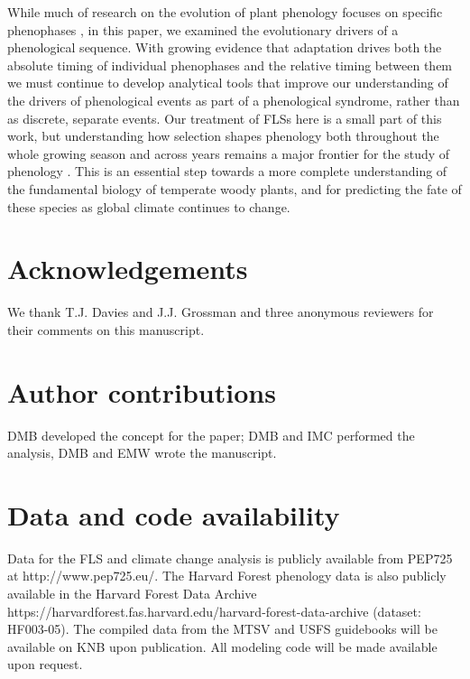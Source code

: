 \documentclass[11pt]{article}
\begin{document}
\noindent While much of research on the evolution of plant phenology focuses on specific phenophases \citep[e.g.][]{Savage2013,OLLERTON_1992}, in this paper, we examined the evolutionary drivers of a phenological sequence. With growing evidence that adaptation drives both the absolute timing of individual phenophases and the relative timing between them we must continue to develop analytical tools that improve our understanding of the drivers of phenological events as part of a phenological syndrome, rather than as discrete, separate events. 
Our treatment of FLSs here is a small part of this work, but understanding how selection shapes phenology both throughout the whole growing season and across years remains a major frontier for the study of phenology \citep{Wolkovich2014b}. This is an essential step towards a more complete understanding of the fundamental biology of temperate woody plants, and for predicting the fate of these species as global climate continues to change.


\section*{Acknowledgements}
\noindent We thank T.J. Davies and J.J. Grossman and three anonymous reviewers for their comments on this manuscript.

\section*{Author contributions}
DMB developed the concept for the paper; DMB and IMC performed the analysis, DMB and EMW wrote the manuscript.

\section*{Data and code availability}
Data for the FLS and climate change analysis is publicly available from PEP725 at http://www.pep725.eu/. The Harvard Forest phenology data is also publicly available in the Harvard Forest Data Archive https://harvardforest.fas.harvard.edu/harvard-forest-data-archive (dataset: HF003-05). The compiled data from the MTSV and USFS guidebooks will be available on KNB upon publication. All modeling code will be made available upon request. %





\newpage
\end{document}
